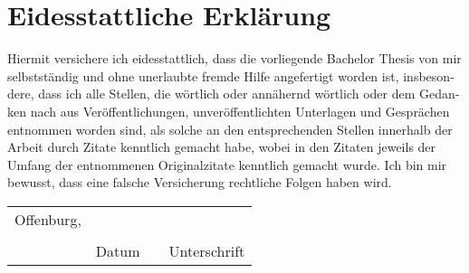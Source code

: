 \section*{Eidesstattliche Erklärung}

\foreignlanguage{ngerman}{
Hiermit  versichere  ich  eidesstattlich,  dass  die  vorliegende  Bachelor
Thesis von mir selbstständig und ohne unerlaubte fremde Hilfe angefertigt worden ist, insbesondere, dass ich alle Stellen, die wörtlich oder 
annähernd wörtlich oder dem Gedanken nach aus Veröffentlichungen,
unveröffentlichten Unterlagen und Gesprächen entnommen worden sind,
als solche an den entsprechenden Stellen innerhalb der Arbeit durch Zitate kenntlich gemacht habe,
wobei in den Zitaten jeweils der Umfang der entnommenen Originalzitate kenntlich gemacht wurde.
Ich  bin  mir  bewusst,  dass  eine  falsche  Versicherung  rechtliche Folgen haben wird.}


\newcommand{\mysignatureblock}[3]{%
  \begin{tabular}{llp{2em}l} 
  #1 & \hspace{4cm}        & & \hspace{4cm} \\\cline{2-2}\cline{4-4}
     &                     & & \\[-3mm]
     & {\footnotesize #2}  & & {\footnotesize #3}
  \end{tabular}
}

\mysignatureblock{Offenburg,}{Datum}{Unterschrift}


\newpage
\newpage
